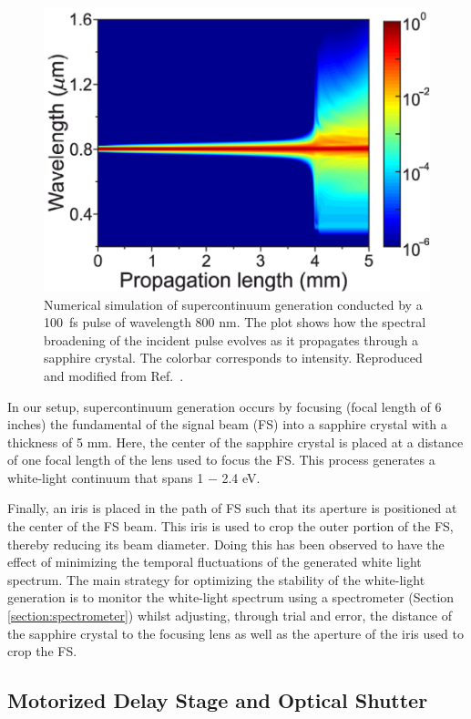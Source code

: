 \begin{figure}[ht]
	\centering
	\includegraphics[scale=0.4]{images/chapter_methods/sc_gen_dubietis}
	\caption{Numerical simulation of supercontinuum generation conducted by a 100~fs pulse of wavelength 800 nm. The plot shows how the spectral broadening of the incident pulse evolves as it propagates through a sapphire crystal. The colorbar corresponds to intensity. Reproduced and modified from Ref.\ \cite{dubietis2017ultrafast}.}
\end{figure}
In our setup, supercontinuum generation occurs by focusing (focal length of 6 inches) the fundamental of the signal beam (FS) into a sapphire crystal with a thickness of 5 mm. Here, the center of the sapphire crystal is placed at a distance of one focal length of the lens used to focus the FS. This process generates a white-light continuum that spans 1 $-$ 2.4 eV.

Finally, an iris is placed in the path of FS such that its aperture is positioned at the center of the FS beam. This iris is used to crop the outer portion of the FS, thereby reducing its beam diameter. Doing this has been observed to have the effect of minimizing the temporal fluctuations of the generated white light spectrum. The main strategy for optimizing the stability of the white-light generation is to monitor the white-light spectrum using a spectrometer (Section \ref{section:spectrometer}) whilst adjusting, through trial and error, the distance of the sapphire crystal to the focusing lens as well as the aperture of the iris used to crop the FS.

\subsection{Motorized Delay Stage and Optical Shutter}

